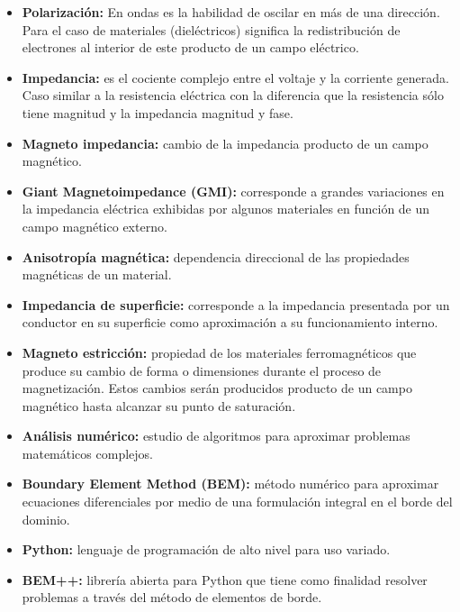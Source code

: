 \documentclass[12pt,letterpaper]{article}
\numberwithin{equation}{section}
\begin{document}
\begin{itemize}
	\item \textbf{Polarización:} En ondas es la habilidad de oscilar en más de una dirección. Para el caso de materiales (dieléctricos) significa la redistribución de electrones al interior de este producto de un campo eléctrico.
	\item \textbf{Impedancia:} es el cociente complejo entre el voltaje y la corriente generada. Caso similar a la resistencia eléctrica con la diferencia que la resistencia sólo tiene magnitud y la impedancia magnitud y fase.
	\item \textbf{Magneto impedancia:} cambio de la impedancia producto de un campo magnético.
	\item \textbf{Giant Magnetoimpedance (GMI):} corresponde a grandes variaciones en la impedancia eléctrica exhibidas por algunos materiales en función de un campo magnético externo.
	\item \textbf{Anisotropía magnética:} dependencia direccional de las propiedades magnéticas de un material.
	\item \textbf{Impedancia de superficie:} corresponde a la impedancia presentada por un conductor en su superficie como aproximación a su funcionamiento interno. 
	\item \textbf{Magneto estricción:} propiedad de los materiales ferromagnéticos que produce su cambio de forma o dimensiones durante el proceso de magnetización. Estos cambios serán producidos producto de un campo magnético hasta alcanzar su punto de saturación.
	\item \textbf{Análisis numérico:} estudio de algoritmos para aproximar problemas matemáticos complejos.
	\item \textbf{Boundary Element Method (BEM):} método numérico para aproximar ecuaciones diferenciales por medio de una formulación integral en el borde del dominio.
	\item \textbf{Python:} lenguaje de programación de alto nivel para uso variado.
	\item \textbf{BEM++:} librería abierta para Python que tiene como finalidad resolver problemas a través del método de elementos de borde.
	
\end{itemize}
\pagebreak
\tableofcontents

\pagebreak
{}
\end{document}
